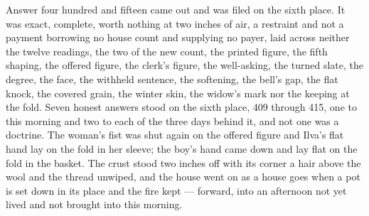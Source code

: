 Answer four hundred and fifteen came out and was filed on the sixth place. It was exact, complete, worth nothing at two inches of air, a restraint and not a payment borrowing no house count and supplying no payer, laid across neither the twelve readings, the two of the new count, the printed figure, the fifth shaping, the offered figure, the clerk's figure, the well-asking, the turned slate, the degree, the face, the withheld sentence, the softening, the bell's gap, the flat knock, the covered grain, the winter skin, the widow's mark nor the keeping at the fold. Seven honest answers stood on the sixth place, 409 through 415, one to this morning and two to each of the three days behind it, and not one was a doctrine. The woman's fist was shut again on the offered figure and Ilva's flat hand lay on the fold in her sleeve; the boy's hand came down and lay flat on the fold in the basket. The crust stood two inches off with its corner a hair above the wool and the thread unwiped, and the house went on as a house goes when a pot is set down in its place and the fire kept --- forward, into an afternoon not yet lived and not brought into this morning.

